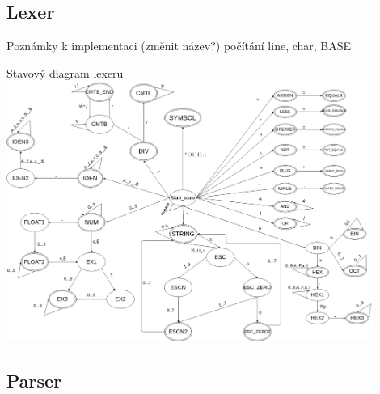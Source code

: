 \documentclass[13pt]{beamer}
\begin{document}
\subsection{Lexer}

\begin{frame}{Poznámky k implementaci (změnit název?)}
počítání line, char, BASE
\end{frame}

\begin{frame}{Stavový diagram lexeru}
\includegraphics[width=0.9\textwidth]{./img/lex1.pdf}

\end{frame}

\subsection{Parser}
\end{document}

